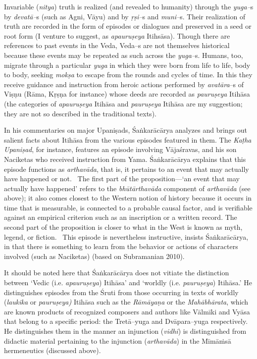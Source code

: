Invariable (\textit{nitya}) truth is realized (and revealed to humanity) through the \textit{yuga–}s by \textit{devatā–}s (such as Agni, Vāyu) and by \textit{ṛṣi–}s and \textit{muni–}s. Their realization of truth are recorded in the form of episodes or dialogues and preserved in a seed or root form (I venture to suggest, as \textit{apauruṣeya} Itihsāsa). Though there are references to past events in the Veda, Veda–s are not themselves historical because these events may be repeated as such across the \textit{yuga–}s. Humans, too, migrate through a particular \textit{yuga} in which they were born from life to life, body to body, seeking \textit{mokṣa} to escape from the rounds and cycles of time. In this they receive guidance and instruction from heroic actions performed by \textit{avatāra}–s of Viṣṇu (Rāma, Kṛṣṇa for instance) whose deeds are recorded as \textit{pauruṣeya} Itihāsa (the categories of \textit{apauruṣeya} Itihāsa and \textit{pauruṣeya} Itihāsa are my suggestion; they are not so described in the traditional texts).

In his commentaries on major Upaniṣads, Śaṅkarācārya analyzes and brings out salient facts about Itihāsa from the various episodes featured in them. The \textit{Kaṭha Upaniṣad}, for instance, features an episode involving Vājaśravas, and his son Naciketas who received instruction from Yama. Śaṅkarācārya explains that this episode functions as \textit{arthavāda}, that is, it pertains to an event that may actually have happened or not.  The first part of the proposition—‘an event that may actually have happened’ refers to the \textit{bhūtārthavāda} component of \textit{arthavāda} (see above); it also comes closest to the Western notion of history because it occurs in time that is measurable, is connected to a probable causal factor, and is verifiable against an empirical criterion such as an inscription or a written record. The second part of the proposition is closer to what in the West is known as myth, legend, or fiction.  This episode is nevertheless instructive, insists Śaṅkarācārya, in that there is something to learn from the behavior or actions of characters involved (such as Naciketas) (based on Subramanian 2010). 

It should be noted here that Śaṅkarācārya does not vitiate the distinction between ‘Vedic (i.e. \textit{apauruṣeya}) Itihāsa’ and ‘worldly (i.e. \textit{pauruṣeya}) Itihāsa.’ He distinguishes episodes from the Śruti from those occurring in texts of worldly (\textit{laukika} or \textit{pauruṣeya)} Itihāsa such as the \textit{Rāmāyaṇa} or the \textit{Mahābhārata}, which are known products of recognized composers and authors like Vālmīki and Vyāsa that belong to a specific period: the Tretā–yuga and Dvāpara–yuga respectively. He distinguishes them in the manner an injunction (\textit{vidhi}) is distinguished from didactic material pertaining to the injunction (\textit{arthavāda}) in the Mīmāṁsā hermeneutics (discussed above). 

